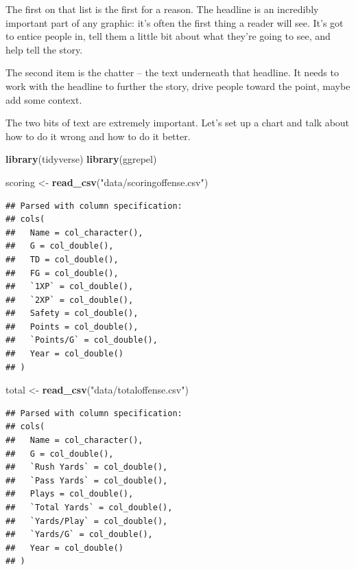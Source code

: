 \documentclass[
]{book}
\newenvironment{Shaded}{\begin{snugshade}}{\end{snugshade}}
\newcommand{\KeywordTok}[1]{\textcolor[rgb]{0.13,0.29,0.53}{\textbf{#1}}}
\newcommand{\NormalTok}[1]{#1}
\newcommand{\StringTok}[1]{\textcolor[rgb]{0.31,0.60,0.02}{#1}}
\begin{document}
The first on that list is the first for a reason. The headline is an incredibly important part of any graphic: it's often the first thing a reader will see. It's got to entice people in, tell them a little bit about what they're going to see, and help tell the story.

The second item is the chatter -- the text underneath that headline. It needs to work with the headline to further the story, drive people toward the point, maybe add some context.

The two bits of text are extremely important. Let's set up a chart and talk about how to do it wrong and how to do it better.

\begin{Shaded}
\begin{Highlighting}[]
\KeywordTok{library}\NormalTok{(tidyverse)}
\KeywordTok{library}\NormalTok{(ggrepel)}
\end{Highlighting}
\end{Shaded}

\begin{Shaded}
\begin{Highlighting}[]
\NormalTok{scoring <-}\StringTok{ }\KeywordTok{read_csv}\NormalTok{(}\StringTok{"data/scoringoffense.csv"}\NormalTok{)}
\end{Highlighting}
\end{Shaded}

\begin{verbatim}
## Parsed with column specification:
## cols(
##   Name = col_character(),
##   G = col_double(),
##   TD = col_double(),
##   FG = col_double(),
##   `1XP` = col_double(),
##   `2XP` = col_double(),
##   Safety = col_double(),
##   Points = col_double(),
##   `Points/G` = col_double(),
##   Year = col_double()
## )
\end{verbatim}

\begin{Shaded}
\begin{Highlighting}[]
\NormalTok{total <-}\StringTok{ }\KeywordTok{read_csv}\NormalTok{(}\StringTok{"data/totaloffense.csv"}\NormalTok{)}
\end{Highlighting}
\end{Shaded}

\begin{verbatim}
## Parsed with column specification:
## cols(
##   Name = col_character(),
##   G = col_double(),
##   `Rush Yards` = col_double(),
##   `Pass Yards` = col_double(),
##   Plays = col_double(),
##   `Total Yards` = col_double(),
##   `Yards/Play` = col_double(),
##   `Yards/G` = col_double(),
##   Year = col_double()
## )
\end{verbatim}
\end{document}
